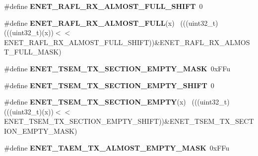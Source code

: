 \begin{DoxyCompactItemize}
\item 
\hypertarget{group___e_n_e_t___register___masks_ga3b190ba30467b67b3d17589f3f193475}{}\#define {\bfseries E\+N\+E\+T\+\_\+\+R\+A\+F\+L\+\_\+\+R\+X\+\_\+\+A\+L\+M\+O\+S\+T\+\_\+\+F\+U\+L\+L\+\_\+\+S\+H\+I\+F\+T}~0\label{group___e_n_e_t___register___masks_ga3b190ba30467b67b3d17589f3f193475}

\item 
\hypertarget{group___e_n_e_t___register___masks_ga069d173107e213b565394ee4a4bf04ae}{}\#define {\bfseries E\+N\+E\+T\+\_\+\+R\+A\+F\+L\+\_\+\+R\+X\+\_\+\+A\+L\+M\+O\+S\+T\+\_\+\+F\+U\+L\+L}(x)                        ~(((uint32\+\_\+t)(((uint32\+\_\+t)(x))$<$$<$E\+N\+E\+T\+\_\+\+R\+A\+F\+L\+\_\+\+R\+X\+\_\+\+A\+L\+M\+O\+S\+T\+\_\+\+F\+U\+L\+L\+\_\+\+S\+H\+I\+F\+T))\&E\+N\+E\+T\+\_\+\+R\+A\+F\+L\+\_\+\+R\+X\+\_\+\+A\+L\+M\+O\+S\+T\+\_\+\+F\+U\+L\+L\+\_\+\+M\+A\+S\+K)\label{group___e_n_e_t___register___masks_ga069d173107e213b565394ee4a4bf04ae}

\item 
\hypertarget{group___e_n_e_t___register___masks_ga2e0f28c4f62db96b87ef5ad97474613d}{}\#define {\bfseries E\+N\+E\+T\+\_\+\+T\+S\+E\+M\+\_\+\+T\+X\+\_\+\+S\+E\+C\+T\+I\+O\+N\+\_\+\+E\+M\+P\+T\+Y\+\_\+\+M\+A\+S\+K}~0x\+F\+Fu\label{group___e_n_e_t___register___masks_ga2e0f28c4f62db96b87ef5ad97474613d}

\item 
\hypertarget{group___e_n_e_t___register___masks_ga246af0bfb3c58b0af12dc0baf7142256}{}\#define {\bfseries E\+N\+E\+T\+\_\+\+T\+S\+E\+M\+\_\+\+T\+X\+\_\+\+S\+E\+C\+T\+I\+O\+N\+\_\+\+E\+M\+P\+T\+Y\+\_\+\+S\+H\+I\+F\+T}~0\label{group___e_n_e_t___register___masks_ga246af0bfb3c58b0af12dc0baf7142256}

\item 
\hypertarget{group___e_n_e_t___register___masks_ga1a4768c6617c921aa92f91dfffc4cc7f}{}\#define {\bfseries E\+N\+E\+T\+\_\+\+T\+S\+E\+M\+\_\+\+T\+X\+\_\+\+S\+E\+C\+T\+I\+O\+N\+\_\+\+E\+M\+P\+T\+Y}(x)                    ~(((uint32\+\_\+t)(((uint32\+\_\+t)(x))$<$$<$E\+N\+E\+T\+\_\+\+T\+S\+E\+M\+\_\+\+T\+X\+\_\+\+S\+E\+C\+T\+I\+O\+N\+\_\+\+E\+M\+P\+T\+Y\+\_\+\+S\+H\+I\+F\+T))\&E\+N\+E\+T\+\_\+\+T\+S\+E\+M\+\_\+\+T\+X\+\_\+\+S\+E\+C\+T\+I\+O\+N\+\_\+\+E\+M\+P\+T\+Y\+\_\+\+M\+A\+S\+K)\label{group___e_n_e_t___register___masks_ga1a4768c6617c921aa92f91dfffc4cc7f}

\item 
\hypertarget{group___e_n_e_t___register___masks_ga477a6ff29213fd6111ad7c072547a40d}{}\#define {\bfseries E\+N\+E\+T\+\_\+\+T\+A\+E\+M\+\_\+\+T\+X\+\_\+\+A\+L\+M\+O\+S\+T\+\_\+\+E\+M\+P\+T\+Y\+\_\+\+M\+A\+S\+K}~0x\+F\+Fu\label{group___e_n_e_t___register___masks_ga477a6ff29213fd6111ad7c072547a40d}


\end{DoxyCompactItemize}
